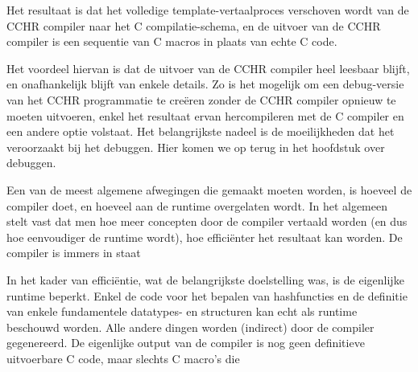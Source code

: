 Het resultaat is dat het volledige template-vertaalproces verschoven wordt van de CCHR compiler naar het C compilatie-schema, en de uitvoer van de CCHR compiler is een sequentie van C macros in plaats van echte C code.

Het voordeel hiervan is dat de uitvoer van de CCHR compiler heel leesbaar blijft, en onafhankelijk blijft van enkele details. Zo is het mogelijk om een debug-versie van het CCHR programmatie te cre\"eren zonder de CCHR compiler opnieuw te moeten uitvoeren, enkel het resultaat ervan hercompileren met de C compiler en een andere optie volstaat. Het belangrijkste nadeel is de moeilijkheden dat het veroorzaakt bij het debuggen. Hier komen we op terug in het hoofdstuk over debuggen.


Een van de meest algemene afwegingen die gemaakt moeten worden, is hoeveel de compiler doet, en hoeveel aan de runtime overgelaten wordt. In het algemeen stelt vast dat men hoe meer concepten door de compiler vertaald worden (en dus hoe eenvoudiger de runtime wordt), hoe effici\"enter het resultaat kan worden. De compiler is immers in staat

In het kader van effici\"entie, wat de belangrijkste doelstelling was, is de eigenlijke runtime beperkt. Enkel de code voor het
bepalen van hashfuncties en de definitie van enkele fundamentele datatypes- en structuren kan echt als runtime beschouwd worden.
Alle andere dingen worden (indirect) door de compiler gegenereerd. De eigenlijke output van de compiler is nog geen definitieve
uitvoerbare C code, maar slechts C macro's die 

